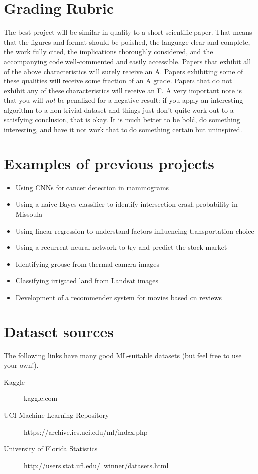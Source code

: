 \documentclass[12pt]{article}
\begin{document}
\section*{Grading Rubric}
The best project will be similar in quality to a short scientific paper.  That means that the figures and format should be polished, the language clear and complete, the work fully cited, the implications thoroughly considered, and the accompanying code well-commented and easily accessible.  Papers that exhibit all of the above characteristics will surely receive an A.  Papers exhibiting some of these qualities will receive some fraction of an A grade. Papers that do not exhibit any of these characteristics will receive an F.  
A very important note is that you will \emph{not} be penalized for a negative result: if you apply an interesting algorithm to a non-trivial dataset and things just don't quite work out to a satisfying conclusion, that is okay.  It is much better to be bold, do something interesting, and have it not work that to do something certain but uninspired.       

\section*{Examples of previous projects}
\begin{itemize}
\item Using CNNs for cancer detection in mammograms
\item Using a naive Bayes classifier to identify intersection crash probability in Missoula
\item Using linear regression to understand factors influencing transportation choice
\item Using a recurrent neural network to try and predict the stock market
\item Identifying grouse from thermal camera images
\item Classifying irrigated land from Landsat images
\item Development of a recommender system for movies based on reviews
\end{itemize}

\section*{Dataset sources}
The following links have many good ML-suitable datasets (but feel free to use your own!).
\begin{description}
\item[Kaggle]{kaggle.com}
\item[UCI Machine Learning Repository]{https://archive.ics.uci.edu/ml/index.php}
\item[University of Florida Statistics]{http://users.stat.ufl.edu/~winner/datasets.html}
\end{description}
\end{document}
